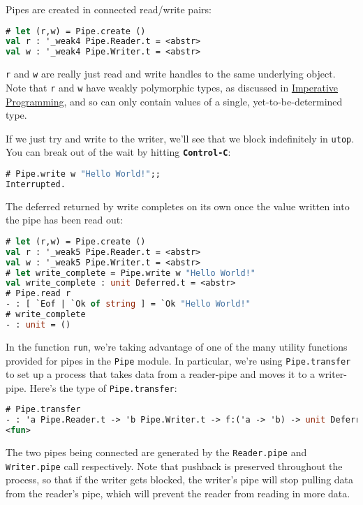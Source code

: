 Pipes are created in connected read/write pairs:

\begin{lstlisting}[language=Caml]
# let (r,w) = Pipe.create ()
val r : '_weak4 Pipe.Reader.t = <abstr>
val w : '_weak4 Pipe.Writer.t = <abstr>
\end{lstlisting}

\passthrough{\lstinline!r!} and \passthrough{\lstinline!w!} are really
just read and write handles to the same underlying object. Note that
\passthrough{\lstinline!r!} and \passthrough{\lstinline!w!} have weakly
polymorphic types, as discussed in
\href{guided-tour.html\#imperative-programming}{Imperative Programming},
and so can only contain values of a single, yet-to-be-determined type.

If we just try and write to the writer, we'll see that we block
indefinitely in \passthrough{\lstinline!utop!}. You can break out of the
wait by hitting \textbf{\passthrough{\lstinline!Control-C!}}:

\begin{lstlisting}[language=Caml]
# Pipe.write w "Hello World!";;
Interrupted.
\end{lstlisting}

The deferred returned by write completes on its own once the value
written into the pipe has been read out:

\begin{lstlisting}[language=Caml]
# let (r,w) = Pipe.create ()
val r : '_weak5 Pipe.Reader.t = <abstr>
val w : '_weak5 Pipe.Writer.t = <abstr>
# let write_complete = Pipe.write w "Hello World!"
val write_complete : unit Deferred.t = <abstr>
# Pipe.read r
- : [ `Eof | `Ok of string ] = `Ok "Hello World!"
# write_complete
- : unit = ()
\end{lstlisting}

In the function \passthrough{\lstinline!run!}, we're taking advantage of
one of the many utility functions provided for pipes in the
\passthrough{\lstinline!Pipe!} module. In particular, we're using
\passthrough{\lstinline!Pipe.transfer!} to set up a process that takes
data from a reader-pipe and moves it to a writer-pipe. Here's the type
of \passthrough{\lstinline!Pipe.transfer!}:

\begin{lstlisting}[language=Caml]
# Pipe.transfer
- : 'a Pipe.Reader.t -> 'b Pipe.Writer.t -> f:('a -> 'b) -> unit Deferred.t =
<fun>
\end{lstlisting}

The two pipes being connected are generated by the
\passthrough{\lstinline!Reader.pipe!} and
\passthrough{\lstinline!Writer.pipe!} call respectively. Note that
pushback is preserved throughout the process, so that if the writer gets
blocked, the writer's pipe will stop pulling data from the reader's
pipe, which will prevent the reader from reading in more data.

